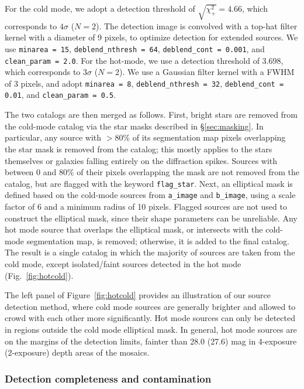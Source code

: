 \documentclass[longauth]{aa}
\begin{document}
For the cold mode, we adopt a detection threshold of $\sqrt{\chi^2_+} = 4.66$, which corresponds to $4\sigma$ ($N=2$). 
The detection image is convolved with a top-hat  filter kernel with a diameter of 9 pixels, to optimize detection for extended sources.  We use \verb|minarea = 15|,  \verb|deblend_nthresh = 64|, \verb|deblend_cont = 0.001|, and \verb|clean_param = 2.0|. For the  hot-mode, we use a detection threshold of $3.698$, which corresponds to $3\sigma$ ($N=2$). We use a Gaussian filter kernel with a FWHM of 3 pixels, and adopt \verb|minarea = 8|,  \verb|deblend_nthresh = 32|, \verb|deblend_cont = 0.01|, and \verb|clean_param = 0.5|. 

The two catalogs are then merged as follows. First, bright stars are removed from the cold-mode catalog via the star masks described in \S\ref{sec:masking}. In particular, any source with $>80\%$ of its segmentation map pixels overlapping the star mask is removed from the catalog; this mostly applies to the stars themselves or galaxies falling entirely on the diffraction spikes. Sources with between 0 and 80\% of their pixels overlapping the mask are not removed from the catalog, but are flagged with the keyword \texttt{flag\_star}. Next, an elliptical mask is defined based on the cold-mode sources from \verb|a_image| and \verb|b_image|, using a scale factor of 6 and a minimum radius of 10 pixels. Flagged sources are not used to construct the elliptical mask, since their shape parameters can be unreliable. Any hot mode source that overlaps the elliptical mask, or intersects with the cold-mode segmentation map, is removed; otherwise, it is added to the final catalog. 
The result is a single catalog in which the majority of sources are taken from the cold mode, except isolated/faint sources detected in the hot mode (Fig.~\ref{fig:hotcold}). 

The left panel of Figure~\ref{fig:hotcold} provides an illustration of our  source detection method, where cold mode sources are generally brighter and allowed to crowd with each other more significantly.  Hot mode sources can only be detected in regions outside the cold mode elliptical mask. In general, hot mode sources are on the margins of the detection limits, fainter than 28.0 (27.6) mag in 4-exposure (2-exposure) depth areas of the mosaics.

\subsubsection{Detection completeness and contamination} \label{sec:hotcold-complete-contam}
\end{document}

